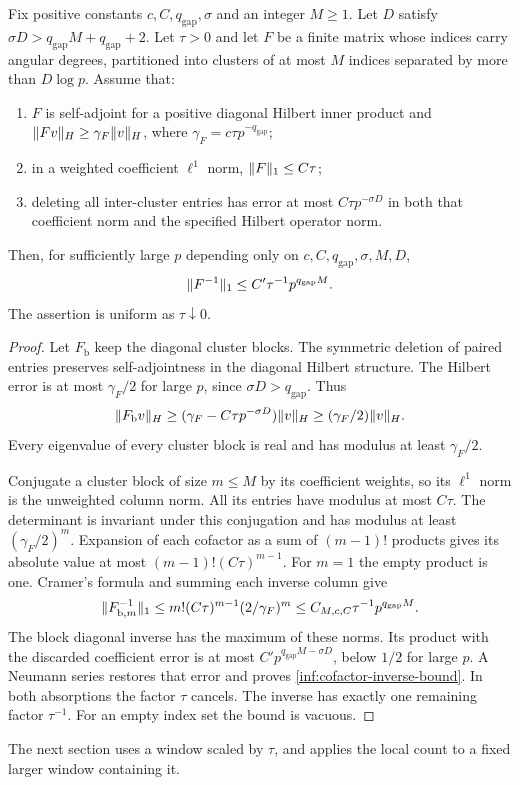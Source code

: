 \begin{lemma}
\label{inf:cluster-inverse}
Fix positive constants $c,C,q_{\mathrm{gap}},\sigma$ and an integer $M\ge1$.
Let $D$ satisfy $\sigma D>q_{\mathrm{gap}}M+q_{\mathrm{gap}}+2$.
Let $\tau>0$ and let $F$ be a finite matrix whose indices
carry angular degrees, partitioned into clusters of at most $M$
indices separated by more than $D\log p$.
Assume that:
\begin{enumerate}[label=\textup{(\roman*)}]
\item $F$ is self-adjoint for a positive diagonal Hilbert inner
product and $\lVert Fv\rVert_H\ge\gamma_F\lVert v\rVert_H$, where
$\gamma_F=c\tau p^{-q_{\mathrm{gap}}}$;
\item in a weighted coefficient $\ell^1$ norm,
$\lVert F\rVert_1\le C\tau$;
\item deleting all inter-cluster entries has error at most
$C\tau p^{-\sigma D}$ in both that coefficient norm and the
specified Hilbert operator norm.
\end{enumerate}
Then, for sufficiently large $p$ depending only on
$c,C,q_{\mathrm{gap}},\sigma,M,D$,
\begin{equation}\label{inf:cofactor-inverse-bound}
 \lVert F^{-1}\rVert_1\le C'\tau^{-1}p^{q_{\mathrm{gap}}M}.
\end{equation}
The assertion is uniform as $\tau\downarrow0$.
\end{lemma}
\begin{proof}
Let $F_{\mathrm b}$ keep the diagonal cluster blocks.
The symmetric deletion of paired entries preserves
self-adjointness in the diagonal Hilbert structure.
The Hilbert error is at most $\gamma_F/2$ for large $p$, since
$\sigma D>q_{\mathrm{gap}}$. Thus
\[
 \lVert F_{\mathrm b}v\rVert_H\ge
 (\gamma_F-C\tau p^{-\sigma D})\lVert v\rVert_H\ge(\gamma_F/2)\lVert v\rVert_H.
\]
Every eigenvalue of every cluster block is real and has modulus
at least $\gamma_F/2$.

Conjugate a cluster block of size $m\le M$ by its coefficient
weights, so its $\ell^1$ norm is the unweighted column norm.
All its entries have modulus at most $C\tau$.
The determinant is invariant under this conjugation and has
modulus at least $(\gamma_F/2)^m$.
Expansion of each cofactor as a sum of $(m-1)!$ products gives
its absolute value at most $(m-1)!(C\tau)^{m-1}$.
For $m=1$ the empty product is one.
Cramer's formula and summing each inverse column give
\[
 \lVert F_{\mathrm b,m}^{-1}\rVert_1
 \le m!(C\tau)^{m-1}(2/\gamma_F)^m
 \le C_{M,c,C}\tau^{-1}p^{q_{\mathrm{gap}}M}.
\]
The block diagonal inverse has the maximum of these norms.
Its product with the discarded coefficient error is at most
$C'p^{q_{\mathrm{gap}}M-\sigma D}$, below $1/2$ for large $p$.
A Neumann series restores that error and proves
\eqref{inf:cofactor-inverse-bound}.
In both absorptions the factor $\tau$ cancels. The inverse has
exactly one remaining factor $\tau^{-1}$.
For an empty index set the bound is vacuous.
\end{proof}

The next section uses a window scaled by $\tau$,
and applies the local count to a fixed larger window containing it.
